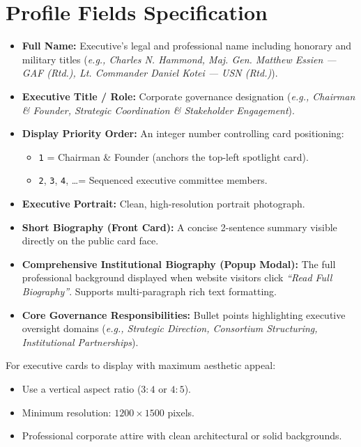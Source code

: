 \documentclass[11pt,a4paper,oneside]{book}
\begin{document}
\section{Profile Fields Specification}
\begin{itemize}
  \item \textbf{Full Name:} Executive’s legal and professional name including honorary and military titles (\textit{e.g., Charles N. Hammond, Maj. Gen. Matthew Essien --- GAF (Rtd.), Lt. Commander Daniel Kotei --- USN (Rtd.)}).
  \item \textbf{Executive Title / Role:} Corporate governance designation (\textit{e.g., Chairman \& Founder, Strategic Coordination \& Stakeholder Engagement}).
  \item \textbf{Display Priority Order:} An integer number controlling card positioning:
    \begin{itemize}
      \item \texttt{1} = Chairman \& Founder (anchors the top-left spotlight card).
      \item \texttt{2}, \texttt{3}, \texttt{4}, \dots = Sequenced executive committee members.
    \end{itemize}
  \item \textbf{Executive Portrait:} Clean, high-resolution portrait photograph.
  \item \textbf{Short Biography (Front Card):} A concise 2-sentence summary visible directly on the public card face.
  \item \textbf{Comprehensive Institutional Biography (Popup Modal):} The full professional background displayed when website visitors click \textit{``Read Full Biography''}. Supports multi-paragraph rich text formatting.
  \item \textbf{Core Governance Responsibilities:} Bullet points highlighting executive oversight domains (\textit{e.g., Strategic Direction, Consortium Structuring, Institutional Partnerships}).
\end{itemize}

\begin{tipbox}
For executive cards to display with maximum aesthetic appeal:
\begin{itemize}
  \item Use a vertical aspect ratio ($3:4$ or $4:5$).
  \item Minimum resolution: $1200\times1500$ pixels.
  \item Professional corporate attire with clean architectural or solid backgrounds.
\end{itemize}
\end{tipbox}
\end{document}

